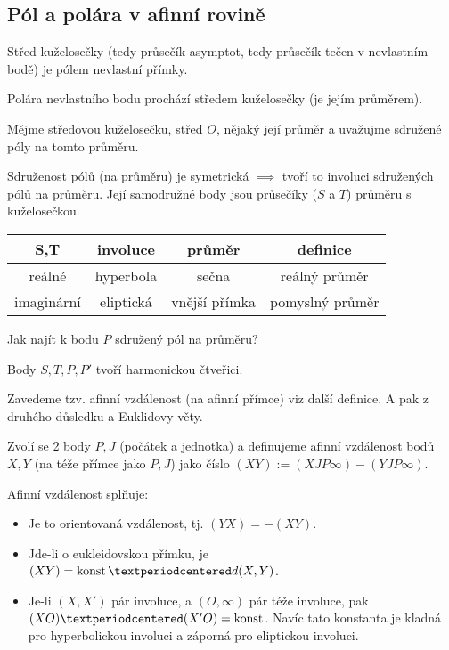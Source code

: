 \documentclass[12pt]{article}					%
\begin{document}
\subsection{Pól a polára v afinní rovině}
\begin{poznamka}[Platí]
	Střed kuželosečky (tedy průsečík asymptot, tedy průsečík tečen v nevlastním bodě) je pólem nevlastní přímky.

	Polára nevlastního bodu prochází středem kuželosečky (je jejím průměrem).
\end{poznamka}

\begin{poznamka}
	Mějme středovou kuželosečku, střed $O$, nějaký její průměr a uvažujme sdružené póly na tomto průměru.

	Sdruženost pólů (na průměru) je symetrická $\implies$ tvoří to involuci sdružených pólů na průměru. Její samodružné body jsou průsečíky ($S$ a $T$) průměru s kuželosečkou.

	\begin{tabular}{c|ccc}
		S,T        & involuce  & průměr        & definice        \\ \hline
		reálné     & hyperbola & sečna         & reálný průměr   \\
		imaginární & eliptická & vnější přímka & pomyslný průměr
	\end{tabular}
\end{poznamka}

\begin{priklad}
	Jak najít k bodu $P$ sdružený pól na průměru?

	\begin{reseni}[1.]
		Body $S, T, P, P'$ tvoří harmonickou čtveřici.
	\end{reseni}

	\begin{reseni}[2.]
		Zavedeme tzv. afinní vzdálenost (na afinní přímce) viz další definice. A pak z druhého důsledku a Euklidovy věty.
	\end{reseni}
\end{priklad}

\begin{definice}
	Zvolí se 2 body $P, J$ (počátek a jednotka) a definujeme afinní vzdálenost bodů $X, Y$ (na téže přímce jako $P, J$) jako číslo $(XY) := (XJP∞) - (YJP∞)$.	
\end{definice}

\begin{dusledek}
	Afinní vzdálenost splňuje:

	\begin{itemize}
		\item Je to orientovaná vzdálenost, tj. $(YX) = -(XY)$.
		\item Jde-li o eukleidovskou přímku, je $(XY) = \konst · d(X, Y)$.
		\item Je-li $(X, X')$ pár involuce, a $(O, ∞)$ pár téže involuce, pak $(XO)·(X'O) = \konst$. Navíc tato konstanta je kladná pro hyperbolickou involuci a záporná pro eliptickou involuci.
	\end{itemize}
\end{dusledek}
\end{document}
